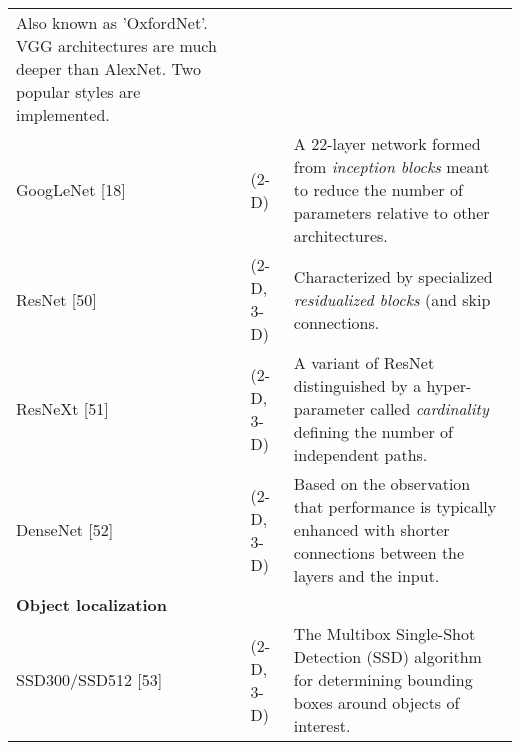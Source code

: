 \begin{table}[!htb]
\begin{tabular*}{\textwidth}{ll@{\extracolsep{\fill}}l}
\begin{minipage}[t]{0.6\columnwidth}
        Also known as 'OxfordNet'.  VGG architectures are much 
        deeper than AlexNet.  Two popular styles are implemented. %
    \end{minipage} \\ \vspace{0.2cm} 
  GoogLeNet [18] & (2-D) & %
    \begin{minipage}[t]{0.6\columnwidth}%
        A 22-layer network formed from {\em inception blocks} meant
        to reduce the number of parameters relative to other architectures.
    \end{minipage} \\ \vspace{0.2cm} 
  ResNet [50]  & (2-D, 3-D) &    %
    \begin{minipage}[t]{0.6\columnwidth}%
        Characterized by specialized {\em residualized blocks} (and
        skip connections. %
    \end{minipage} \\ \vspace{0.2cm} 
  ResNeXt [51] & (2-D, 3-D) &  %
    \begin{minipage}[t]{0.6\columnwidth}%
        A variant of ResNet distinguished by a hyper-parameter called 
        {\em cardinality} defining the number of independent paths. %
    \end{minipage} \\ \vspace{0.3cm} 
  DenseNet [52] & (2-D, 3-D) & %
    \begin{minipage}[t]{0.6\columnwidth}%
        Based on the observation that performance is typically enhanced 
        with shorter connections between the layers and the input.%
    \end{minipage} \\
\midrule    
\multicolumn{3}{l}{\textbf{Object localization}} 
  \vspace{0.25cm} \\ \vspace{0.2cm} 
  SSD300/SSD512 [53] & (2-D, 3-D) & %
    \begin{minipage}[t]{0.6\columnwidth}%
        The Multibox Single-Shot Detection (SSD) algorithm for
        determining bounding boxes around objects of interest. %

\end{minipage}
\end{tabular*}
\end{table}

